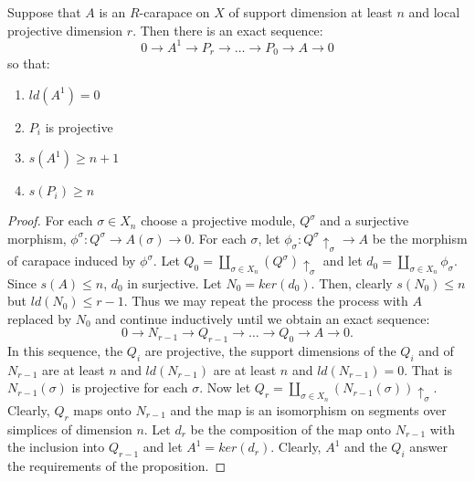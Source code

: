 \begin{prop}\label{art6-proposition-4.2}
Suppose that $A$ is an $R$-carapace on $X$ of support dimension at least $n$ and local projective dimension $r$. Then  there is an exact sequence:
\begin{equation}\label{art6-equation-4.3}
0 \rightarrow A^{1} \rightarrow P_{r}\rightarrow\ldots \rightarrow P_{0} \rightarrow A \rightarrow 0
\end{equation}
so that:
    \begin{enumerate}[(1)]
    \item $ld(A^{1}) = 0$\label{art6-equation-enum-1}
    \item $P_{i}$ is projective\label{art6-equation-enum-2}
    \item $s(A^{1})\geq n+1$\label{art6-equation-enum-3}
    \item $s(P_{i}) \geq n$\label{art6-equation-enum-4}
    \end{enumerate}
\end{prop}

\begin{proof}
For each $\sigma \in X_{n}$ choose a projective module, $Q^{\sigma}$ and a surjective morphism, $\phi^{\sigma} : Q^{\sigma} \rightarrow A(\sigma)\rightarrow 0$. For each $\sigma$, let $\phi_{\sigma} : Q^{\sigma}\uparrow_{\sigma} \rightarrow A$ be the morphism of carapace induced by $\phi^{\sigma}$. Let $Q_{0}= \coprod_{\sigma\in X_{n}}(Q^{\sigma})\uparrow_{\sigma}$ and let $d_{0}=\coprod_{\sigma \in X_{n}}\phi_{\sigma}$. Since $s(A)\leq n$, $d_{0}$ in surjective. Let $N_{0} =ker(d_{0})$. Then, clearly $s(N_{0}) \leq n$ but $ld(N_{0})\leq r-1$. Thus we may repeat the process the process with $A$ replaced by $N_{0}$ and continue inductively until we obtain an exact sequence:
$$
0 \rightarrow N_{r-1} \rightarrow Q_{r-1} \rightarrow\ldots \rightarrow Q_{0} \rightarrow A \rightarrow 0.
$$
In this sequence, the $Q_{i}$ are projective, the support dimensions of the $Q_{i}$ and of $N_{r-1}$ are at least $n$ and $ld(N_{r-1})$ are at least $n$ and $ld(N_{r-1})=0$. That is $N_{r-1}(\sigma)$ is projective for each $\sigma$. Now let $Q_{r}=\coprod_{\sigma \in X_{n}}(N_{r-1}(\sigma))\uparrow_{\sigma}$. Clearly, $Q_{r}$ maps onto $N_{r-1}$ and the map is an isomorphism on segments over simplices of dimension $n$. Let $d_{r}$ be the composition of the map onto $N_{r-1}$ with the inclusion into $Q_{r-1}$ and let $A^{1} =ker(d_{r})$. Clearly, $A^{1}$ and the $Q_{i}$ answer the requirements of the proposition.
\end{proof}

